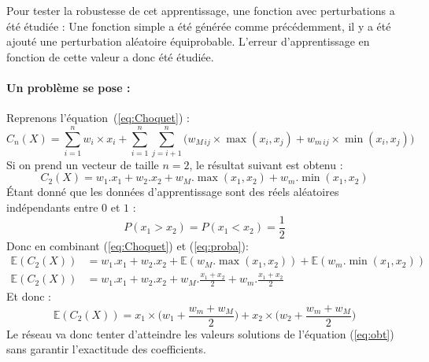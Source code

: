 Pour tester la robustesse de cet apprentissage, une fonction avec perturbations a été étudiée :
Une fonction simple a été générée comme précédemment, il y a été ajouté une perturbation aléatoire équiprobable.
L’erreur d’apprentissage en fonction de cette valeur a donc été étudiée.\\


\paragraph{Un problème se pose :}
Reprenons l'équation\ (\ref{eq:Choquet}) :
\begin{equation*}
    C_n (X) =
        \sum_{i=1}^{n}
                w_i \times x_i +
            \sum_{i=1}^{n}\sum_{j=i+1}^{n}
            \Big(
                w_{M\,ij} \times \max(x_i,x_j) + w_{m\,ij} \times \min(x_i,x_j)
            \Big)
\end{equation*}
Si on prend un vecteur de taille $n=2$, le résultat suivant est obtenu :
\begin{equation*}
    C_2 (X)
    =
        w_1.x_1 + w_2.x_2 + w_M.\max(x_1,x_2) + w_m.\min(x_1,x_2)
\end{equation*}
Étant donné que les données d'apprentissage sont des réels aléatoires indépendants entre $0$ et $1$ :
\begin{equation}
    \label{eq:proba}
    P(x_1 > x_2) = P(x_1 < x_2) = \frac{1}{2}
\end{equation}
Donc en combinant (\ref{eq:Choquet}) et (\ref{eq:proba}):
\begin{align*}
    \mathbb{E}(C_2 (X))
    & =
        w_1.x_1 + w_2.x_2 + \mathbb{E}(w_M.\max(x_1,x_2)) + \mathbb{E}(w_m.\min(x_1,x_2))
    &\\
    \mathbb{E}(C_2 (X))
    & =
        w_1.x_1 + w_2.x_2 + w_M.\frac{x_1 + x_2}{2} + w_m.\frac{x_1 + x_2}{2}
    &
\end{align*}
Et donc :
\begin{equation}
    \label{eq:obt}
    \mathbb{E}(C_2 (X)) =
        x_1 \times \Big(w_1 + \frac{w_m + w_M}{2}\Big) + x_2 \times \Big(w_2 + \frac{w_m + w_M}{2}\Big)
\end{equation}
Le réseau va donc tenter d'atteindre les valeurs solutions de l'équation
(\ref{eq:obt}) sans garantir l'exactitude des coefficients.

